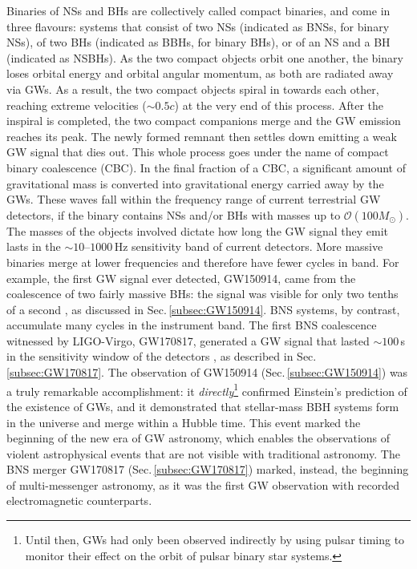 \documentclass[binding=0.6cm, LaM]{sapthesis}
\begin{document}
        Binaries of NSs and BHs are collectively called compact binaries,
        and come in three flavours: systems that consist of two NSs (indicated as BNSs, for binary NSs), 
	of two BHs (indicated as BBHs, for binary BHs), or of an NS and a BH (indicated as NSBHs).
        As the two compact objects orbit one another, the binary loses orbital energy and orbital angular momentum, 
	as both are radiated away via GWs.
        As a result, the two compact objects spiral in towards each other, 
	reaching extreme velocities ($\sim 0.5c$) at the very end of this process. 
        After the inspiral is completed, the two compact companions merge and 
	the GW emission reaches its peak. 
	The newly formed remnant then settles down emitting a weak GW signal that dies out.
	This whole process goes under the name of compact binary coalescence (CBC).
	In the final fraction of a CBC, a significant amount of gravitational mass is converted 
	into gravitational energy carried away by the GWs.
	These waves fall within the frequency range of current terrestrial GW detectors, 
	if the binary contains NSs and/or BHs with masses up to $\mathcal{O}(100M_\odot)$.
        The masses of the objects involved dictate how long the GW signal they emit 
	lasts in the $\sim 10$--$1000$\,Hz sensitivity band of current detectors.
        More massive binaries merge at lower frequencies and therefore have fewer cycles in band.
        For example, the first GW signal ever detected, GW150914, 
	came from the coalescence of two fairly massive BHs: 
	the signal was visible for only two tenths of a second \cite{14}, 
	as discussed in Sec.\,\ref{subsec:GW150914}. 
        BNS systems, by contrast, accumulate many cycles in the instrument band.
        The first BNS coalescence witnessed by LIGO-Virgo, GW170817, 
	generated a GW signal that lasted $\sim 100\,$s in the sensitivity window of the detectors \cite{15}, 
	as described in Sec.\,\ref{subsec:GW170817}.
	The observation of GW150914 (Sec.\,\ref{subsec:GW150914}) was a truly remarkable accomplishment: 
	it \emph{directly}\footnote{Until then, GWs had only been observed indirectly by using pulsar timing to monitor 
        their effect on the orbit of pulsar binary star systems.} confirmed Einstein's prediction of the existence of GWs, 
	and it demonstrated that stellar-mass BBH systems form in the universe and merge within a Hubble time.
	This event marked the beginning of the new era of GW astronomy, 
	which enables the observations of violent astrophysical events that are not visible with traditional astronomy.
	The BNS merger GW170817 (Sec.\,\ref{subsec:GW170817}) marked, instead, the beginning of multi-messenger astronomy,
        as it was the first GW observation with recorded electromagnetic counterparts.
\end{document}
